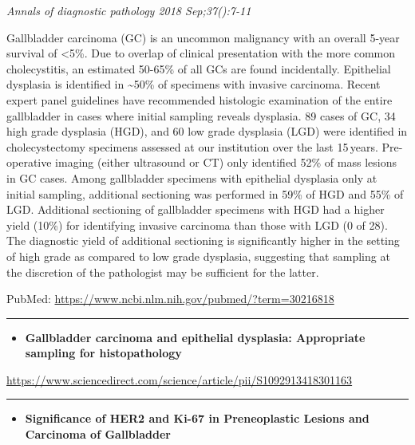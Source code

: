 \documentclass[]{article}
\providecommand{\tightlist}{%
  \setlength{\itemsep}{0pt}\setlength{\parskip}{0pt}}
\begin{document}
\emph{Annals of diagnostic pathology 2018 Sep;37():7-11}

Gallbladder carcinoma (GC) is an uncommon malignancy with an overall
5-year survival of \textless{}5\%. Due to overlap of clinical
presentation with the more common cholecystitis, an estimated 50-65\% of
all GCs are found incidentally. Epithelial dysplasia is identified in
\textasciitilde{}50\% of specimens with invasive carcinoma. Recent
expert panel guidelines have recommended histologic examination of the
entire gallbladder in cases where initial sampling reveals dysplasia. 89
cases of GC, 34 high grade dysplasia (HGD), and 60 low grade dysplasia
(LGD) were identified in cholecystectomy specimens assessed at our
institution over the last 15\,years. Pre-operative imaging (either
ultrasound or CT) only identified 52\% of mass lesions in GC cases.
Among gallbladder specimens with epithelial dysplasia only at initial
sampling, additional sectioning was performed in 59\% of HGD and 55\% of
LGD. Additional sectioning of gallbladder specimens with HGD had a
higher yield (10\%) for identifying invasive carcinoma than those with
LGD (0 of 28). The diagnostic yield of additional sectioning is
significantly higher in the setting of high grade as compared to low
grade dysplasia, suggesting that sampling at the discretion of the
pathologist may be sufficient for the latter.

PubMed: \url{https://www.ncbi.nlm.nih.gov/pubmed/?term=30216818}

{}

{}

\begin{center}\rule{0.5\linewidth}{\linethickness}\end{center}

\begin{itemize}
\tightlist
\item
  \textbf{Gallbladder carcinoma and epithelial dysplasia: Appropriate
  sampling for histopathology}
\end{itemize}

\url{https://www.sciencedirect.com/science/article/pii/S1092913418301163}

\begin{center}\rule{0.5\linewidth}{\linethickness}\end{center}

\begin{itemize}
\tightlist
\item
  \textbf{Significance of HER2 and Ki-67 in Preneoplastic Lesions and
  Carcinoma of Gallbladder}
\end{itemize}
\end{document}
